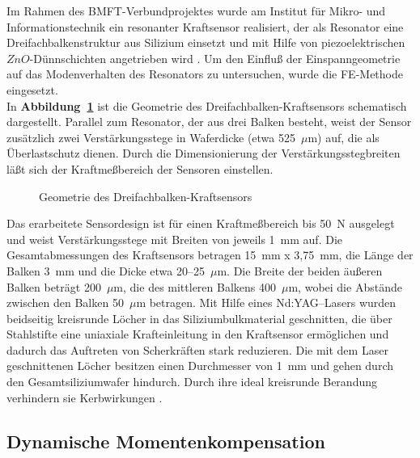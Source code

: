 Im Rahmen des BMFT-Verbundprojektes wurde am Institut für Mikro-
und Informationstechnik ein resonanter Kraftsensor realisiert, der
als Resonator eine Dreifachbalkenstruktur aus Silizium einsetzt und
mit Hilfe von piezoelektrischen $ZnO$-Dünnschichten angetrieben wird
\cite{ABV93}. Um den Einfluß der Einspanngeometrie auf das Modenverhalten
des Resonators zu untersuchen, wurde die FE-Methode eingesetzt.\\
In {\bf Abbildung~\ref{abbtriplebeam}} ist die Geometrie des
Dreifachbalken-Kraftsensors schematisch dargestellt. Parallel zum Resonator,
der aus drei Balken besteht, weist der Sensor zusätzlich zwei
Verstärkungsstege in Waferdicke (etwa 525~$\mu$m) auf, die als
Überlastschutz dienen. Durch die Dimensionierung der Verstärkungsstegbreiten
läßt sich der Kraftmeßbereich der Sensoren einstellen.
\begin{figure}[htb]

\begin{center}

\setabbse
\end{center}
\caption{\label{abbtriplebeam}
 Geometrie des Dreifachbalken-Kraftsensors}
\end{figure}

Das erarbeitete Sensordesign ist für einen Kraftmeßbereich
bis 50~N ausgelegt und weist Verstärkungsstege mit Breiten von jeweils 1~mm
auf. Die Gesamtabmessungen des Kraftsensors betragen 15~mm x 3,75~mm,
die Länge der Balken 3~mm und die Dicke etwa 20--25~$\mu$m. Die Breite
der beiden äußeren Balken beträgt 200~$\mu$m, die des mittleren Balkens
400~$\mu$m, wobei die Abstände zwischen den Balken 50~$\mu$m betragen.
Mit Hilfe eines Nd:YAG--Lasers wurden beidseitig kreisrunde Löcher in das
Siliziumbulkmaterial geschnitten, die über Stahlstifte eine uniaxiale
Krafteinleitung in den Kraftsensor ermöglichen und dadurch das Auftreten
von Scherkräften stark reduzieren. Die mit dem Laser geschnittenen Löcher
besitzen einen Durchmesser von 1~mm und gehen durch den Gesamtsiliziumwafer
hindurch. Durch ihre ideal kreisrunde Berandung verhindern sie
Kerbwirkungen \cite{Dissaxel}.



\subsection{Dynamische Momentenkompensation}
\label{dynamischemomentenkompensation}

